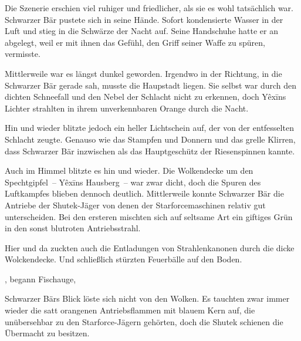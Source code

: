 Die Szenerie erschien viel ruhiger und friedlicher, als sie es wohl tatsächlich war. Schwarzer Bär pustete sich in seine Hände. Sofort kondensierte Wasser in der Luft und stieg in die Schwärze der Nacht auf. Seine Handschuhe hatte er an abgelegt, weil er mit ihnen das Gefühl, den Griff seiner Waffe zu spüren, vermisste.

\par

Mittlerweile war es längst dunkel geworden. Irgendwo in der Richtung, in die Schwarzer Bär gerade sah, musste die Haupstadt liegen. Sie selbst war durch den dichten Schneefall und den Nebel der Schlacht nicht zu erkennen, doch Yêxīns Lichter strahlten in ihrem unverkennbaren Orange durch die Nacht.

\par

Hin und wieder blitzte jedoch ein heller Lichtschein auf, der von der entfesselten Schlacht zeugte. Genauso wie das Stampfen und Donnern und das grelle Klirren, dass Schwarzer Bär inzwischen als das Hauptgeschütz der Riesenspinnen kannte.

\par

Auch im Himmel blitzte es hin und wieder. Die Wolkendecke um den Spechtgipfel~-- Yêxīns Hausberg~-- war zwar dicht, doch die Spuren des Luftkampfes blieben dennoch deutlich. Mittlerweile konnte Schwarzer Bär die Antriebe der Shutek-Jäger von denen der Starforcemaschinen relativ gut unterscheiden. Bei den ersteren mischten sich auf seltsame Art ein giftiges Grün in den sonst blutroten Antriebsstrahl.

\par

Hier und da zuckten auch die Entladungen von Strahlenkanonen durch die dicke Wolckendecke. Und schließlich stürzten Feuerbälle auf den Boden.

\par

, begann Fischauge, 

\par

Schwarzer Bärs Blick löste sich nicht von den Wolken. Es tauchten zwar immer wieder die satt orangenen Antriebsflammen mit blauem Kern auf, die unübersehbar zu den Starforce-Jägern gehörten, doch die Shutek schienen die Übermacht zu besitzen.

\par

